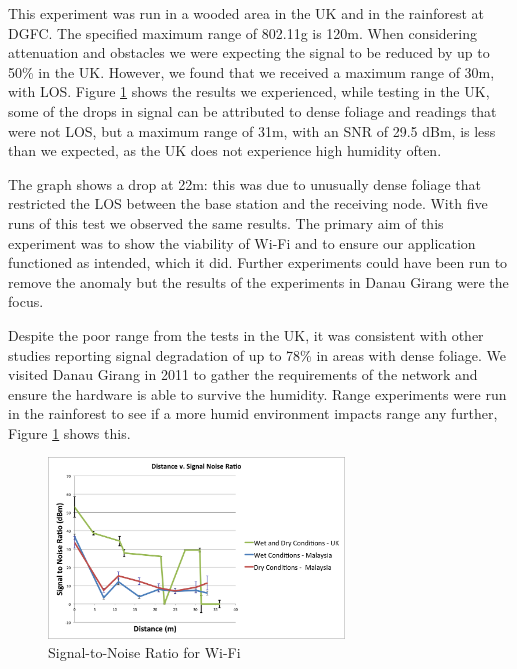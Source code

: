 This experiment was run in a wooded area in the UK and in the rainforest at DGFC. The specified maximum range of 802.11g is 120m. When considering attenuation and obstacles we were expecting the signal to be reduced by up to 50\% in the UK. However, we found that we received a maximum range of 30m, with LOS. Figure \ref{fig:test} shows the results we experienced, while testing in the UK, some of the drops in signal can be attributed to dense foliage and readings that were not LOS, but a maximum range of 31m, with an SNR of 29.5 dBm, is less than we expected, as the UK does not experience high humidity often.
			
	The graph shows a drop at 22m: this was due to unusually dense foliage that restricted the LOS between the base station and the receiving node. With five runs of this test we observed the same results. The primary aim of this experiment was to show the viability of Wi-Fi and to ensure our application functioned as intended, which it did. Further experiments could have been run to remove the anomaly but the results of the experiments in Danau Girang were the focus.
		 
	Despite the poor range from the tests in the UK, it was consistent with other studies reporting signal degradation of up to 78\% in areas with dense foliage. We visited Danau Girang in 2011 to gather the requirements of the network and ensure the hardware is able to survive the humidity. Range experiments were run in the rainforest to see if a more humid environment impacts range any further, Figure \ref{fig:test} shows this.

\begin{figure}[ht!]
\centering
\includegraphics[width=0.7\textwidth]{Chap3/figures/combined_snr.png}
\caption{Signal-to-Noise Ratio for Wi-Fi}
\label{fig:test}
\end{figure}
						
